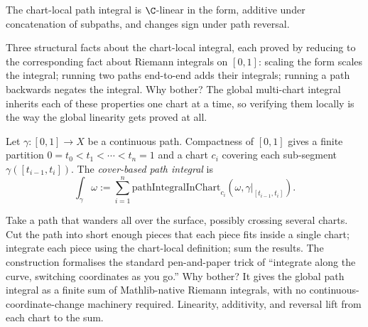 \begin{lemma}
\label{lem:path-integral-in-chart-linearity}
The chart-local path integral is \(\C\)-linear in the form, additive
under concatenation of subpaths, and changes sign under path
reversal.
\leanok
\end{lemma}

\begin{layman}
Three structural facts about the chart-local integral, each proved
by reducing to the corresponding fact about Riemann integrals on
\([0,1]\): scaling the form scales the integral; running two paths
end-to-end adds their integrals; running a path backwards negates
the integral. Why bother? The global multi-chart integral inherits
each of these properties one chart at a time, so verifying them
locally is the way the global linearity gets proved at all.
\end{layman}

\begin{definition}
\label{def:path-integral-via-cover}
Let \(\gamma:[0,1]\to X\) be a continuous path. Compactness of
\([0,1]\) gives a finite partition
\(0=t_0<t_1<\cdots<t_n=1\) and a chart \(c_i\) covering each
sub-segment \(\gamma([t_{i-1},t_i])\). The \emph{cover-based path
integral} is
\[
  \int_\gamma \omega
    := \sum_{i=1}^{n}
       \mathrm{pathIntegralInChart}_{c_i}(\omega,\gamma|_{[t_{i-1},t_i]}).
\]
\leanok
\end{definition}

\begin{layman}
Take a path that wanders all over the surface, possibly crossing
several charts. Cut the path into short enough pieces that each
piece fits inside a single chart; integrate each piece using the
chart-local definition; sum the results. The construction
formalises the standard pen-and-paper trick of ``integrate along
the curve, switching coordinates as you go.'' Why bother? It gives
the global path integral as a finite sum of Mathlib-native
Riemann integrals, with no continuous-coordinate-change machinery
required. Linearity, additivity, and reversal lift from each chart
to the sum.
\end{layman}

